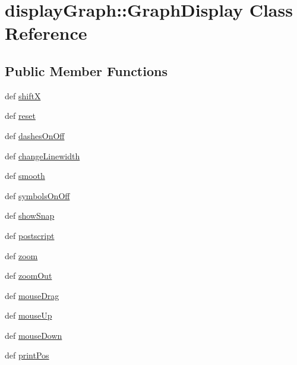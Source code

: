 \hypertarget{classdisplayGraph_1_1GraphDisplay}{
\section{displayGraph::GraphDisplay Class Reference}
\label{classdisplayGraph_1_1GraphDisplay}
}
\subsection*{Public Member Functions}
\begin{CompactItemize}
\item 
def \hyperlink{classdisplayGraph_1_1GraphDisplay_4bd5ab8f7f95777dd9c9cb92178c9a6e}{shiftX}
\item 
def \hyperlink{classdisplayGraph_1_1GraphDisplay_1a7e8d7110f4cdbc36e62a5c1e9920b0}{reset}
\item 
def \hyperlink{classdisplayGraph_1_1GraphDisplay_4d2640c75cc429166b04a22ec5e70785}{dashesOnOff}
\item 
def \hyperlink{classdisplayGraph_1_1GraphDisplay_004e09b1b5cff52ae7d40ab36314e57d}{changeLinewidth}
\item 
def \hyperlink{classdisplayGraph_1_1GraphDisplay_78d4f90391aa72a5217d52c0ffe5bc72}{smooth}
\item 
def \hyperlink{classdisplayGraph_1_1GraphDisplay_a0d27ef72b22f370ee3ce826175d569b}{symbolsOnOff}
\item 
def \hyperlink{classdisplayGraph_1_1GraphDisplay_a44dbbdc876e647107da6f0cc84a5a16}{showSnap}
\item 
def \hyperlink{classdisplayGraph_1_1GraphDisplay_063cf7b2b25487f4d82c7fe2d74bdab1}{postscript}
\item 
def \hyperlink{classdisplayGraph_1_1GraphDisplay_c91bed418cdd12ecaeeeea51e2051077}{zoom}
\item 
def \hyperlink{classdisplayGraph_1_1GraphDisplay_19af20f3bd2e8d7cf2cd70ed41f3b7ad}{zoomOut}
\item 
def \hyperlink{classdisplayGraph_1_1GraphDisplay_400d312aee6b087c503d72e06177b2d2}{mouseDrag}
\item 
def \hyperlink{classdisplayGraph_1_1GraphDisplay_731bb7d38804e40ff5c73e9dde75e8da}{mouseUp}
\item 
def \hyperlink{classdisplayGraph_1_1GraphDisplay_be9b44409edae276e59615e582fb9fa7}{mouseDown}
\item 
def \hyperlink{classdisplayGraph_1_1GraphDisplay_5072381036a74d4a2ef48afba6dd3f2f}{printPos}
\item 

\end{CompactItemize}
